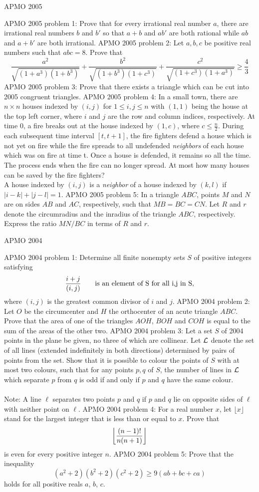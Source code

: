 APMO 2005 

APMO 2005 problem 1:  Prove that for every irrational real number $a$, there are irrational real numbers $b$ and $b'$ so that $a+b$ and $ab'$ are both rational while $ab$ and $a+b'$ are both irrational. 
APMO 2005 problem 2:  Let $a, b, c$ be positive real numbers such that $abc=8$. Prove that
\[
\frac{a^2}{\sqrt{(1+a^3)(1+b^3)}} +\frac{b^2}{\sqrt{(1+b^3)(1+c^3)}} +\frac{c^2}{\sqrt{(1+c^3)(1+a^3)}} \geq \frac{4}{3}
\] 
APMO 2005 problem 3:  Prove that there exists a triangle which can be cut into 2005 congruent triangles. 
APMO 2005 problem 4:  In a small town, there are $n \times n$ houses indexed by $(i, j)$ for $1 \leq i, j \leq n$ with $(1, 1)$ being the house at the top left corner, where $i$ and $j$ are the row and column indices, respectively. At time 0, a fire breaks out at the house indexed by $(1, c)$, where $c \leq \frac{n}{2}$. During each subsequent time interval $[t, t+1]$, the fire fighters defend a house which is not yet on fire while the fire spreads to all undefended \textit{neighbors} of each house which was on fire at time t. Once a house is defended, it remains so all the time. The process ends when the fire can no longer spread. At most how many houses can be saved by the fire fighters? \\
A house indexed by $(i, j)$ is a \textit{neighbor} of a house indexed by $(k, l)$ if $|i - k| + |j - l|=1$. 
APMO 2005 problem 5:  In a triangle $ABC$, points $M$ and $N$ are on sides $AB$ and $AC$, respectively, such that $MB = BC = CN$. Let $R$ and $r$ denote the circumradius and the inradius of the triangle $ABC$, respectively. Express the ratio $MN/BC$ in terms of $R$ and $r$. 

APMO 2004 

APMO 2004 problem 1:  Determine all finite nonempty sets $S$ of positive integers satisfying
\[ {i+j\over (i,j)}\qquad\mbox{is an element of S for all i,j in S}, \]
where $(i,j)$ is the greatest common divisor of $i$ and $j$. 
APMO 2004 problem 2:  Let $O$ be the circumcenter and $H$ the orthocenter of an acute triangle $ABC$. Prove that the area of one of the triangles $AOH$, $BOH$ and $COH$ is equal to the sum of the areas of the other two. 
APMO 2004 problem 3:  Let a set $S$ of 2004 points in the plane be given, no three of which are collinear. Let ${\cal L}$ denote the set of all lines (extended indefinitely in both directions) determined by pairs of points from the set. Show that it is possible to colour the points of $S$ with at most two colours, such that for any points $p,q$ of $S$, the number of lines in ${\cal L}$ which separate $p$ from $q$ is odd if and only if $p$ and $q$ have the same colour. \\\\
Note: A line $\ell$ separates two points $p$ and $q$ if $p$ and $q$ lie on opposite sides of $\ell$ with neither point on $\ell$. 
APMO 2004 problem 4:  For a real number $x$, let $\lfloor x\rfloor$ stand for the largest integer that is less than or equal to $x$. Prove that
\[ \left\lfloor{(n-1)!\over n(n+1)}\right\rfloor \]
is even for every positive integer $n$. 
APMO 2004 problem 5:  Prove that the inequality
\[ \left(a^2+2\right)\left(b^2+2\right)\left(c^2+2\right) \geq 9\left(ab+bc+ca\right) \]
holds for all positive reals $a$, $b$, $c$. 

